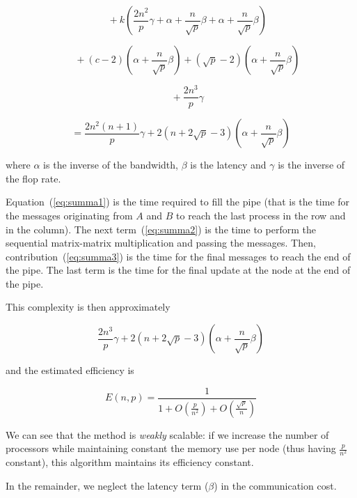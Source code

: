 \documentclass[pdftex,11pt]{article}
\begin{document}
\begin{equation}
~~~~~~+k(\frac{2n^{2}}{p}\gamma+\alpha+\frac{n}{\sqrt{p}}\beta+\alpha+\frac{n}{\sqrt{p}}\beta)
\label{eq:summa2}
\end{equation}

\begin{equation}
~~~~~~+(c-2)(\alpha+\frac{n}{\sqrt{p}}\beta)+(\sqrt{p}-2)(\alpha+\frac{n}{\sqrt{p}}\beta)
\label{eq:summa3}
\end{equation}

\begin{equation}
~~~~~~+\frac{2n^{3}}{p}\gamma
\label{eq:summa4}
\end{equation}

\begin{equation}
= \frac{2n^{2}(n+1)}{p}\gamma+ 2(n+2\sqrt{p}-3)(\alpha+\frac{n}{\sqrt{p}}\beta)
\label{eq:summa5}
\end{equation}

where $\alpha$ is the inverse of the bandwidth, $\beta$ is the latency
and $\gamma$ is the inverse of the flop rate.

Equation~(\ref{eq:summa1}) is the time required to fill the pipe (that
is the time for the messages originating from $A$ and $B$ to reach the
last process in the row and in the column). The next
term~(\ref{eq:summa2}) is the time to perform the sequential
matrix-matrix multiplication and passing the messages. Then,
contribution~(\ref{eq:summa3}) is the time for the final messages to
reach the end of the pipe. The last term is the time for the final
update at the node at the end of the pipe.

This complexity is then approximately

\begin{equation}
\frac{2n^{3}}{p}\gamma+2(n+2\sqrt{p}-3)(\alpha+\frac{n}{\sqrt{p}}\beta)
\end{equation}

and the estimated efficiency is

\begin{equation}
E(n,p)=\frac{1}{1+O(\frac{p}{n^{2}})+O(\frac{\sqrt{p}}{n})}
\end{equation}

We can see that the method is \textit{weakly} scalable: if we increase
the number of processors while maintaining constant the memory use per
node (thus having $\frac{p}{n^{2}}$ constant), this algorithm
maintains its efficiency constant.

In the remainder, we neglect the latency term ($\beta$) in the
communication cost.
\end{document}

